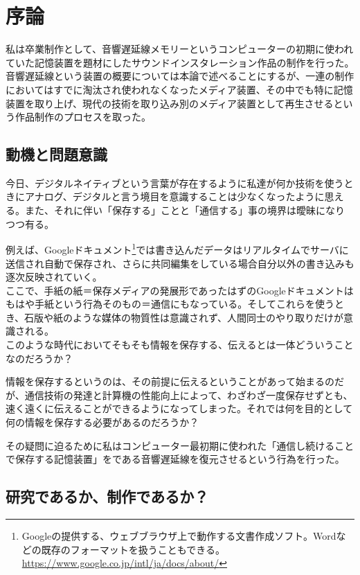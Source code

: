 \chapter{序論}\label{ux5e8fux8ad6}

私は卒業制作として、音響遅延線メモリーというコンピューターの初期に使われていた記憶装置を題材にしたサウンドインスタレーション作品の制作を行った。\\
音響遅延線という装置の概要については本論で述べることにするが、一連の制作においてはすでに淘汰され使われなくなったメディア装置、その中でも特に記憶装置を取り上げ、現代の技術を取り込み別のメディア装置として再生させるという作品制作のプロセスを取った。

\section{動機と問題意識}\label{ux52d5ux6a5fux3068ux554fux984cux610fux8b58}

今日、デジタルネイティブという言葉が存在するように私達が何か技術を使うときにアナログ、デジタルと言う境目を意識することは少なくなったように思える。また、それに伴い「保存する」ことと「通信する」事の境界は曖昧になりつつ有る。

例えば、Googleドキュメント\footnote{Googleの提供する、ウェブブラウザ上で動作する文書作成ソフト。Wordなどの既存のフォーマットを扱うこともできる。\url{https://www.google.co.jp/intl/ja/docs/about/}}では書き込んだデータはリアルタイムでサーバに送信され自動で保存され、さらに共同編集をしている場合自分以外の書き込みも逐次反映されていく。\\
ここで、手紙の紙＝保存メディアの発展形であったはずのGoogleドキュメントはもはや手紙という行為そのもの＝通信にもなっている。そしてこれらを使うとき、石版や紙のような媒体の物質性は意識されず、人間同士のやり取りだけが意識される。\\
このような時代においてそもそも情報を保存する、伝えるとは一体どういうことなのだろうか？

情報を保存するというのは、その前提に伝えるということがあって始まるのだが、通信技術の発達と計算機の性能向上によって、わざわざ一度保存せずとも、速く遠くに伝えることができるようになってしまった。それでは何を目的として何の情報を保存する必要があるのだろうか？

その疑問に迫るために私はコンピューター最初期に使われた「通信し続けることで保存する記憶装置」をである音響遅延線を復元させるという行為を行った。

\section{研究であるか、制作であるか？}\label{ux7814ux7a76ux3067ux3042ux308bux304bux5236ux4f5cux3067ux3042ux308bux304b}

